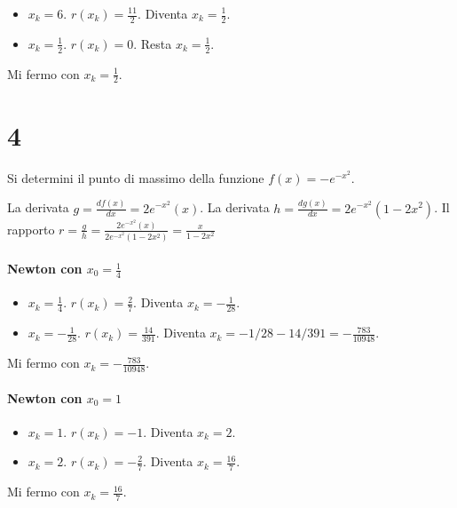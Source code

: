 \begin{itemize}
    \item $x_k = 6$. $r(x_k) = \frac {11} 2$. Diventa $x_k = \frac 1 2$.
    \item $x_k = \frac 1 2$. $r(x_k) = 0$. Resta $x_k = \frac 1 2$.
\end{itemize}

Mi fermo con $x_k = \frac 1 2$.

\section{4}

Si determini il punto di massimo della funzione $f(x) = -e^{-x^2}$.

La derivata $g = \frac {df(x)} {dx} = 2e^{-x^2}(x)$.
La derivata $h = \frac {dg(x)} {dx} = 2e^{-x^2}(1 - 2x^2)$.
Il rapporto $r = \frac g h = \frac {2e^{-x^2}(x)} {2e^{-x^2}(1 - 2x^2)} = \frac {x} {1 - 2x^2}$

\paragraph{Newton con $x_0 = \frac 1 4$}

\begin{itemize}
    \item $x_k = \frac 1 4$. $r(x_k) = \frac 2 7$. Diventa $x_k = -\frac 1 {28}$.
    \item $x_k = -\frac 1 {28}$. $r(x_k) = \frac {14} {391}$. Diventa $x_k = -1/28 - 14/391 = -\frac {783} {10948}$.
\end{itemize}

Mi fermo con $x_k = -\frac {783} {10948}$.

\paragraph{Newton con $x_0 = 1$}

\begin{itemize}
    \item $x_k = 1$. $r(x_k) = -1$. Diventa $x_k = 2$.
    \item $x_k = 2$. $r(x_k) = -\frac 2 7$. Diventa $x_k = \frac {16} {7}$.
\end{itemize}

Mi fermo con $x_k = \frac {16} {7}$.


